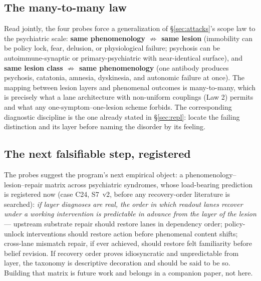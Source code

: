 \documentclass[9pt,twocolumn]{article}
\begin{document}
\subsection{The many-to-many law}
Read jointly, the four probes force a generalization of \S\ref{sec:attacks}'s scope law to the psychiatric scale: \textbf{same phenomenology $\not\Rightarrow$ same lesion} (immobility can be policy lock, fear, delusion, or physiological failure; psychosis can be autoimmune-synaptic or primary-psychiatric with near-identical surface), and \textbf{same lesion class $\not\Rightarrow$ same phenomenology} (one antibody produces psychosis, catatonia, amnesia, dyskinesia, and autonomic failure at once). The mapping between lesion layers and phenomenal outcomes is many-to-many, which is precisely what a lane architecture with non-uniform couplings (Law 2) permits and what any one-symptom--one-lesion scheme forbids. The corresponding diagnostic discipline is the one already stated in \S\ref{sec:repl}: locate the failing distinction and its layer before naming the disorder by its feeling.

\subsection{The next falsifiable step, registered}
The probes suggest the program's next empirical object: a phenomenology--lesion--repair matrix across psychiatric syndromes, whose load-bearing prediction is registered now (case C24, S7~v2, before any recovery-order literature is searched): \emph{if layer diagnoses are real, the order in which readout lanes recover under a working intervention is predictable in advance from the layer of the lesion} --- upstream substrate repair should restore lanes in dependency order; policy-unlock interventions should restore action before phenomenal content shifts; cross-lane mismatch repair, if ever achieved, should restore felt familiarity before belief revision. If recovery order proves idiosyncratic and unpredictable from layer, the taxonomy is descriptive decoration and should be said to be so. Building that matrix is future work and belongs in a companion paper, not here.
\end{document}
